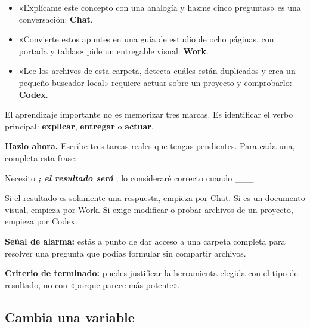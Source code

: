 \documentclass[10pt,a4paper,openany]{book}
\providecommand{\tightlist}{\setlength{\itemsep}{0.18em}\setlength{\parskip}{0pt}}
\renewenvironment{quote}
  {\begin{tcolorbox}[
    enhanced,breakable,colback=Panel,colframe=Border,boxrule=0.4pt,
    borderline west={2.4pt}{0pt}{BrandFuchsia},arc=1mm,
    left=3mm,right=3mm,top=2mm,bottom=2mm,
    before skip=0.8em,after skip=0.8em,
    fontupper=\itshape\color{TextMuted}
  ]}
  {\end{tcolorbox}}
\begin{document}
\begin{itemize}
\tightlist
\item
  «Explícame este concepto con una analogía y hazme cinco preguntas» es
  una conversación: \textbf{Chat}.
\item
  «Convierte estos apuntes en una guía de estudio de ocho páginas, con
  portada y tablas» pide un entregable visual: \textbf{Work}.
\item
  «Lee los archivos de esta carpeta, detecta cuáles están duplicados y
  crea un pequeño buscador local» requiere actuar sobre un proyecto y
  comprobarlo: \textbf{Codex}.
\end{itemize}

El aprendizaje importante no es memorizar tres marcas. Es identificar el
verbo principal: \textbf{explicar}, \textbf{entregar} o \textbf{actuar}.

\begin{practicebox}

\textbf{Hazlo ahora.} Escribe tres tareas reales que tengas pendientes.
Para cada una, completa esta frase:

\end{practicebox}

\begin{quote}
Necesito \textbf{\emph{; el resultado será }}; lo consideraré correcto
cuando \_\_\_.
\end{quote}

Si el resultado es solamente una respuesta, empieza por Chat. Si es un
documento visual, empieza por Work. Si exige modificar o probar archivos
de un proyecto, empieza por Codex.

\begin{warningbox}

\textbf{Señal de alarma:} estás a punto de dar acceso a una carpeta
completa para resolver una pregunta que podías formular sin compartir
archivos.

\end{warningbox}

\begin{successbox}

\textbf{Criterio de terminado:} puedes justificar la herramienta elegida
con el tipo de resultado, no con «porque parece más potente».

\end{successbox}

\subsection{Cambia una variable}\label{cambia-una-variable}
\end{document}
